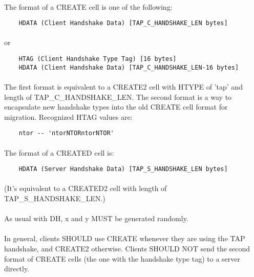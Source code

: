 \paragraph{}
The format of a CREATE cell is one of the following:

\begin{verbatim}
    HDATA (Client Handshake Data) [TAP_C_HANDSHAKE_LEN bytes]
\end{verbatim}
\paragraph{}
or
\begin{verbatim}
    HTAG (Client Handshake Type Tag) [16 bytes]
    HDATA (Client Handshake Data) [TAP_C_HANDSHAKE_LEN-16 bytes]
\end{verbatim}

\paragraph{}
The first format is equivalent to a CREATE2 cell with HTYPE of 'tap'
and length of TAP\_C\_HANDSHAKE\_LEN. The second format is a way to
encapsulate new handshake types into the old CREATE cell format for
migration. Recognized HTAG values are:

\begin{verbatim}
    ntor -- 'ntorNTORntorNTOR'
\end{verbatim}

\paragraph{}
The format of a CREATED cell is:

\begin{verbatim}
    HDATA (Server Handshake Data) [TAP_S_HANDSHAKE_LEN bytes]
\end{verbatim}

\paragraph{}
(It's equivalent to a CREATED2 cell with length of TAP\_S\_HANDSHAKE\_LEN.)

\paragraph{}
As usual with DH, x and y MUST be generated randomly.

\paragraph{}
In general, clients SHOULD use CREATE whenever they are using the TAP
handshake, and CREATE2 otherwise. Clients SHOULD NOT send the
second format of CREATE cells (the one with the handshake type tag)
to a server directly.

